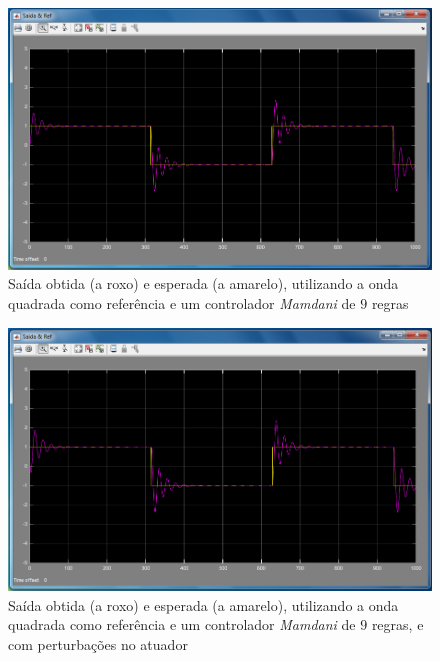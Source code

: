 \documentclass{article}
\begin{document}
\begin{figure}[h]
  \centering
      \includegraphics[scale=0.3]{Images/Mamdani_9_square.png}
  \caption{Saída obtida (a roxo) e esperada (a amarelo), utilizando a onda quadrada como referência e um controlador \emph{Mamdani} de $9$ regras}
\end{figure}

\begin{figure}[h]
  \centering
      \includegraphics[scale=0.3]{Images/Mamdani_9_square_actuator.png}
  \caption{Saída obtida (a roxo) e esperada (a amarelo), utilizando a onda quadrada como referência e um controlador \emph{Mamdani} de $9$ regras, e com perturbações no atuador}
\end{figure}
\end{document}
